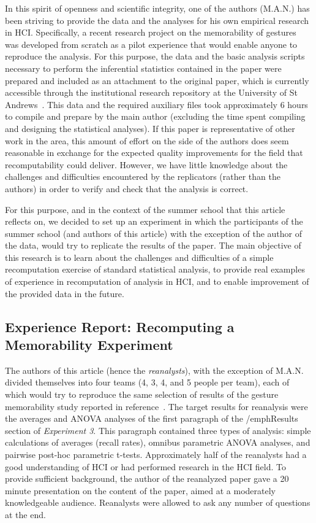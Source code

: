 In this spirit of openness and scientific integrity, one of the authors (M.A.N.) has been striving to provide the data and the analyses for his own empirical research in HCI. Specifically, a recent research project on the memorability of gestures~\cite{Nacenta:memorability} was developed from scratch as a pilot experience that would enable anyone to reproduce the analysis. For this purpose, the data and the basic analysis scripts necessary to perform the inferential statistics contained in the paper were prepared and included as an attachment to the original paper, which is currently accessible through the institutional research repository at the University of St Andrews~\cite{Nacenta:memorability_data}. This data and the required auxiliary files took approximately 6 hours to compile and prepare by the main author (excluding the time spent compiling and designing the statistical analyses). If this paper is representative of other work in the area, this amount of effort on the side of the authors does seem reasonable in exchange for the expected quality improvements for the field that recomputability could deliver. However, we have little knowledge about the challenges and difficulties encountered by the replicators (rather than the authors) in order to verify and check that the analysis is correct.

For this purpose, and in the context of the summer school that this article reflects on, we decided to set up an experiment in which the participants of the summer school (and authors of this article) with the exception of the author of the data, would try to replicate the results of the paper. The main objective of this research is to learn about the challenges and difficulties of a simple recomputation exercise of standard statistical analysis, to provide real examples of experience in recomputation of analysis in HCI, and to enable improvement of the provided data in the future.

\subsection{Experience Report: Recomputing a Memorability Experiment}
The authors of this article (hence the \emph{reanalysts}), with the exception of
M.A.N. divided themselves into four teams (4, 3, 4, and 5 people per team), each of which would try to reproduce the same selection of results of the gesture memorability study reported in reference~\cite{Nacenta:memorability}. The target results for reanalysis were the averages and ANOVA analyses of the first paragraph of the /emph{Results} section of \emph{Experiment 3}. This paragraph contained three types of analysis: simple calculations of averages (recall rates), omnibus parametric ANOVA analyses, and pairwise post-hoc parametric t-tests. Approximately half of the reanalysts had a good understanding of HCI or had performed research in the HCI field. To provide sufficient background, the author of the reanalyzed paper gave a 20 minute presentation on the content of the paper, aimed at a moderately knowledgeable audience. Reanalysts were allowed to ask any number of questions at the end.

